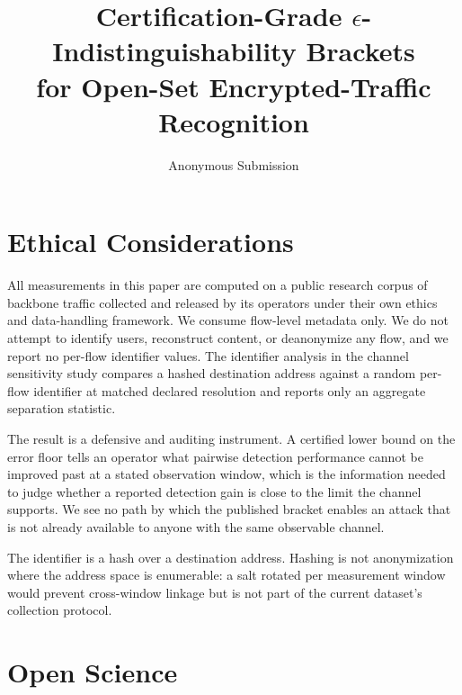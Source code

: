 \documentclass[letterpaper,twocolumn,10pt]{article}
\title{\Large \bf Certification-Grade $\epsilon$-Indistinguishability Brackets\\
  for Open-Set Encrypted-Traffic Recognition}
\author{Anonymous Submission}
\date{}
\begin{document}
\maketitle

















\appendix

\clearpage
\section*{Ethical Considerations}
\label{sec:appendix/ethics}

All measurements in this paper are computed on a public research corpus of
backbone traffic collected and released by its operators under their own ethics
and data-handling framework. We consume flow-level metadata only. We do not
attempt to identify users, reconstruct content, or deanonymize any flow, and we
report no per-flow identifier values. The identifier analysis in the channel
sensitivity study compares a hashed destination address against a random
per-flow identifier at matched declared resolution and reports only an aggregate
separation statistic.

The result is a defensive and auditing instrument. A certified lower bound on
the error floor tells an operator what pairwise detection performance cannot be
improved past at a stated observation window, which is the information needed to
judge whether a reported detection gain is close to the limit the channel
supports. We see no path by which the published bracket enables an attack that is
not already available to anyone with the same observable channel.

The identifier is a hash over a destination address. Hashing is not
anonymization where the address space is enumerable: a salt rotated per
measurement window would prevent cross-window linkage but is not part of the
current dataset's collection protocol.

\section*{Open Science}
\end{document}
